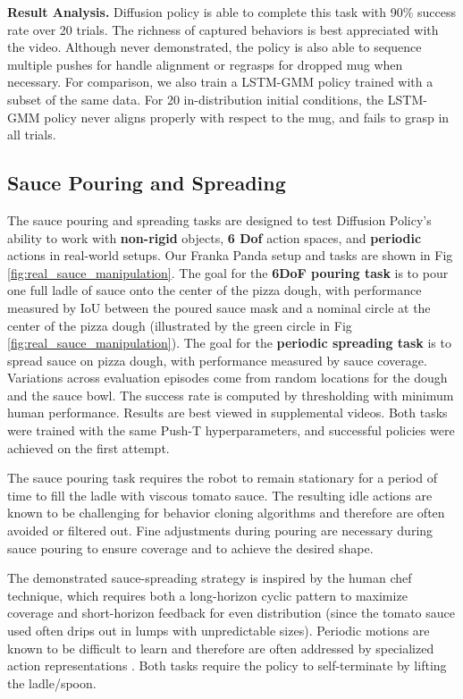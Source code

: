\textbf{Result Analysis.} Diffusion policy is able to complete this task with 90\% success rate over 20 trials. The richness of captured behaviors is best appreciated with the video. Although never demonstrated, the policy is also able to sequence multiple pushes for handle alignment or regrasps for dropped mug when necessary. For comparison, we also train a LSTM-GMM policy trained with a subset of the same data. For 20 in-distribution initial conditions, the LSTM-GMM policy never aligns properly with respect to the mug, and fails to grasp in all trials.

\subsection{Sauce Pouring and Spreading}
The sauce pouring and spreading tasks are designed to test Diffusion Policy's ability to work with \textbf{non-rigid} objects, \textbf{6 Dof} action spaces, and \textbf{periodic} actions in real-world setups. Our Franka Panda setup and tasks are shown in Fig \ref{fig:real_sauce_manipulation}. The goal for the \textbf{6DoF pouring task} is to pour one full ladle of sauce onto the center of the pizza dough, with performance measured by IoU between the poured sauce mask and a nominal circle at the center of the pizza dough (illustrated by the green circle in Fig \ref{fig:real_sauce_manipulation}). 
The goal for the \textbf{periodic spreading task} is to spread sauce on pizza dough, with performance measured by sauce coverage. 
Variations across evaluation episodes come from random locations for the dough and the sauce bowl. 
The success rate is computed by thresholding with minimum human performance. 
Results are best viewed in supplemental videos. 
Both tasks were trained with the same Push-T hyperparameters, and successful policies were achieved on the first attempt.

The sauce pouring task requires the robot to remain stationary for a period of time to fill the ladle with viscous tomato sauce. The resulting idle actions are known to be challenging for behavior cloning algorithms and therefore are often avoided or filtered out. Fine adjustments during pouring are necessary during sauce pouring to ensure coverage and to achieve the desired shape.

The demonstrated sauce-spreading strategy is inspired by the human chef technique, which requires both a long-horizon cyclic pattern to maximize coverage and short-horizon feedback for even distribution (since the tomato sauce used often drips out in lumps with unpredictable sizes). Periodic motions are known to be difficult to learn and therefore are often addressed by specialized action representations \cite{yang2022periodic}.
Both tasks require the policy to self-terminate by lifting the ladle/spoon.

